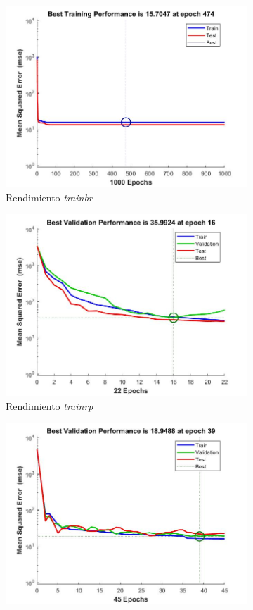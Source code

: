 \documentclass{article}
\begin{document}
\begin{figure}[H]
 \centering
 \begin{subfigure}{0.4\textwidth}
  \includegraphics[width=0.8\linewidth]{../images/I_ex3_performance_bodyfat_dataset_trainbr.jpg}
  \caption{Rendimiento \textit{trainbr}}
 \end{subfigure}
 \begin{subfigure}{0.4\textwidth}
  \includegraphics[width=0.8\linewidth]{../images/I_ex3_performance_bodyfat_dataset_trainrp.jpg}
  \caption{Rendimiento \textit{trainrp}}
 \end{subfigure}
 \begin{subfigure}{0.4\textwidth}
  \includegraphics[width=0.8\linewidth]{../images/I_ex3_performance_bodyfat_dataset_trainoss.jpg}

\end{subfigure}
\end{figure}
\end{document}
